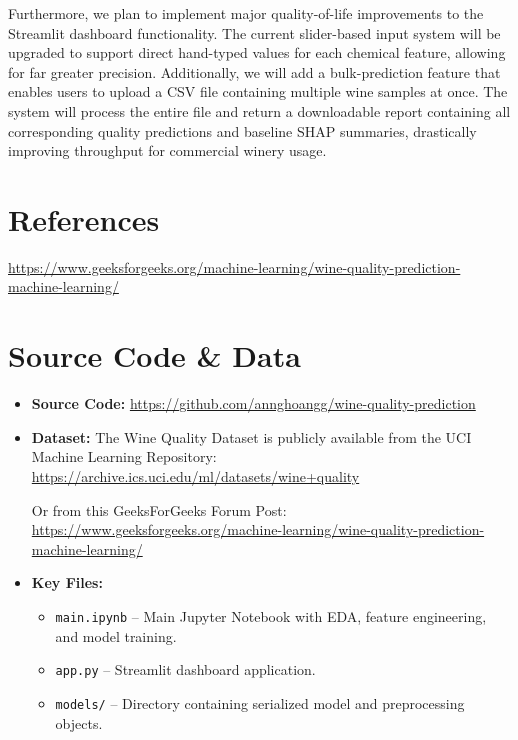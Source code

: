 \documentclass[12pt, a4paper]{article}
\begin{document}
Furthermore, we plan to implement major quality-of-life improvements to the Streamlit dashboard functionality. The current slider-based input system will be upgraded to support direct hand-typed values for each chemical feature, allowing for far greater precision. Additionally, we will add a bulk-prediction feature that enables users to upload a CSV file containing multiple wine samples at once. The system will process the entire file and return a downloadable report containing all corresponding quality predictions and baseline SHAP summaries, drastically improving throughput for commercial winery usage.

\newpage
\section*{References}

\begin{enumerate}[label={[\arabic*]}]
    \item \url{https://www.geeksforgeeks.org/machine-learning/wine-quality-prediction-machine-learning/}
\end{enumerate}

\section*{Source Code \& Data}

\begin{itemize}
    \item \textbf{Source Code:} \url{https://github.com/annghoangg/wine-quality-prediction}
    \item \textbf{Dataset:} The Wine Quality Dataset is publicly available from the UCI Machine Learning Repository: \url{https://archive.ics.uci.edu/ml/datasets/wine+quality}

    Or from this GeeksForGeeks Forum Post:
    \url{https://www.geeksforgeeks.org/machine-learning/wine-quality-prediction-machine-learning/}
    \item \textbf{Key Files:}
    \begin{itemize}
        \item \texttt{main.ipynb} -- Main Jupyter Notebook with EDA, feature engineering, and model training.
        \item \texttt{app.py} -- Streamlit dashboard application.
        \item \texttt{models/} -- Directory containing serialized model and preprocessing objects.
    \end{itemize}
\end{itemize}
\end{document}
